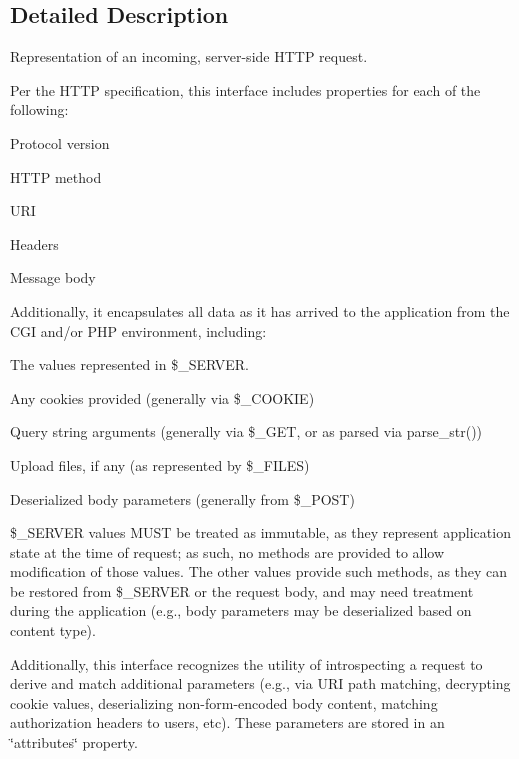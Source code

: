 \subsection{Detailed Description}
Representation of an incoming, server-\/side H\+T\+TP request.

Per the H\+T\+TP specification, this interface includes properties for each of the following\+:


\begin{DoxyItemize}
\item Protocol version
\item H\+T\+TP method
\item U\+RI
\item Headers
\item Message body
\end{DoxyItemize}

Additionally, it encapsulates all data as it has arrived to the application from the C\+GI and/or P\+HP environment, including\+:


\begin{DoxyItemize}
\item The values represented in \$\+\_\+\+S\+E\+R\+V\+ER.
\item Any cookies provided (generally via \$\+\_\+\+C\+O\+O\+K\+IE)
\item Query string arguments (generally via \$\+\_\+\+G\+ET, or as parsed via parse\+\_\+str())
\item Upload files, if any (as represented by \$\+\_\+\+F\+I\+L\+ES)
\item Deserialized body parameters (generally from \$\+\_\+\+P\+O\+ST)
\end{DoxyItemize}

\$\+\_\+\+S\+E\+R\+V\+ER values M\+U\+ST be treated as immutable, as they represent application state at the time of request; as such, no methods are provided to allow modification of those values. The other values provide such methods, as they can be restored from \$\+\_\+\+S\+E\+R\+V\+ER or the request body, and may need treatment during the application (e.\+g., body parameters may be deserialized based on content type).

Additionally, this interface recognizes the utility of introspecting a request to derive and match additional parameters (e.\+g., via U\+RI path matching, decrypting cookie values, deserializing non-\/form-\/encoded body content, matching authorization headers to users, etc). These parameters are stored in an \char`\"{}attributes\char`\"{} property.

